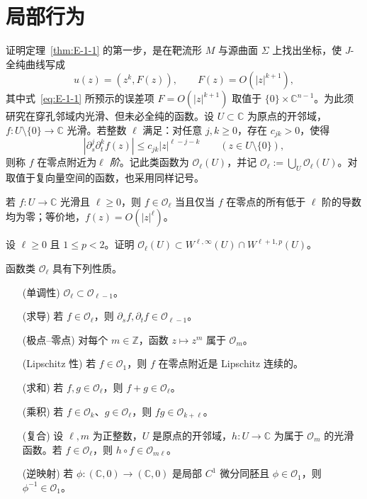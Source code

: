 
\section{局部行为}\label{sec:E-5}

证明定理~\ref{thm:E-1-1} 的第一步，是在靶流形 $M$ 与源曲面 $\Sigma$ 上找出坐标，使 $J$-全纯曲线写成
\[
  u(z)=(z^k,F(z)),\qquad F(z)=O(|z|^{k+1}),
\]
其中式~\eqref{eq:E-1-1} 所预示的误差项 $F=O(|z|^{k+1})$ 取值于 $\{0\}\times\mathbb C^{n-1}$。为此须研究在穿孔邻域内光滑、但未必全纯的函数。设 $U\subset\mathbb C$ 为原点的开邻域，$f:U\setminus\{0\}\to\mathbb C$ 光滑。若整数 $\ell$ 满足：对任意 $j,k\ge0$，存在 $c_{jk}>0$，使得
\begin{equation}\label{eq:E-5-1}
  |\partial_s^j\partial_t^k f(z)|\le c_{jk}|z|^{\ell-j-k}
  \qquad(z\in U\setminus\{0\}),
\end{equation}
则称 $f$ 在零点附近为\emph{$\ell$ 阶}。记此类函数为 $\mathcal O_\ell(U)$，并记 $\mathcal O_\ell:=\bigcup_U\mathcal O_\ell(U)$。对取值于复向量空间的函数，也采用同样记号。

\begin{remark}\label{rem:E-5-1}
若 $f:U\to\mathbb C$ 光滑且 $\ell\ge0$，则 $f\in\mathcal O_\ell$ 当且仅当 $f$ 在零点的所有低于 $\ell$ 阶的导数均为零；等价地，$f(z)=O(|z|^\ell)$。
\end{remark}

\begin{exercise}\label{ex:E-5-2}
设 $\ell\ge0$ 且 $1\le p<2$。证明 $\mathcal O_\ell(U)\subset W^{\ell,\infty}(U)\cap W^{\ell+1,p}(U)$。
\end{exercise}

\begin{lemma}\label{lem:E-5-3}
函数类 $\mathcal O_\ell$ 具有下列性质。
\begin{enumerate}[align=left,labelwidth=7em,leftmargin=7.6em,labelsep=0.6em,itemsep=0.15em]
\item[(单调性)] $\mathcal O_\ell\subset\mathcal O_{\ell-1}$。
\item[(求导)] 若 $f\in\mathcal O_\ell$，则 $\partial_s f,\partial_t f\in\mathcal O_{\ell-1}$。
\item[(极点--零点)] 对每个 $m\in\mathbb Z$，函数 $z\mapsto z^m$ 属于 $\mathcal O_m$。
\item[(Lipschitz 性)] 若 $f\in\mathcal O_1$，则 $f$ 在零点附近是 Lipschitz 连续的。
\item[(求和)] 若 $f,g\in\mathcal O_\ell$，则 $f+g\in\mathcal O_\ell$。
\item[(乘积)] 若 $f\in\mathcal O_k$、$g\in\mathcal O_\ell$，则 $fg\in\mathcal O_{k+\ell}$。
\item[(复合)] 设 $\ell,m$ 为正整数，$U$ 是原点的开邻域，$h:U\to\mathbb C$ 为属于 $\mathcal O_m$ 的光滑函数。若 $f\in\mathcal O_\ell$，则 $h\circ f\in\mathcal O_{m\ell}$。
\item[(逆映射)] 若 $\phi:(\mathbb C,0)\to(\mathbb C,0)$ 是局部 $C^1$ 微分同胚且 $\phi\in\mathcal O_1$，则 $\phi^{-1}\in\mathcal O_1$。
\end{enumerate}
\end{lemma}

